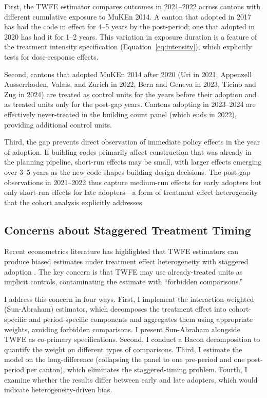 \documentclass[12pt]{article}
\begin{document}
First, the TWFE estimator compares outcomes in 2021--2022 across cantons with different cumulative exposure to MuKEn 2014. A canton that adopted in 2017 has had the code in effect for 4--5 years by the post-period; one that adopted in 2020 has had it for 1--2 years. This variation in exposure duration is a feature of the treatment intensity specification (Equation~\ref{eq:intensity}), which explicitly tests for dose-response effects.

Second, cantons that adopted MuKEn 2014 after 2020 (Uri in 2021, Appenzell Ausserrhoden, Valais, and Zurich in 2022, Bern and Geneva in 2023, Ticino and Zug in 2024) are treated as control units for the years before their adoption and as treated units only for the post-gap years. Cantons adopting in 2023--2024 are effectively never-treated in the building count panel (which ends in 2022), providing additional control units.

Third, the gap prevents direct observation of immediate policy effects in the year of adoption. If building codes primarily affect construction that was already in the planning pipeline, short-run effects may be small, with larger effects emerging over 3--5 years as the new code shapes building design decisions. The post-gap observations in 2021--2022 thus capture medium-run effects for early adopters but only short-run effects for late adopters---a form of treatment effect heterogeneity that the cohort analysis explicitly addresses.

\subsection{Concerns about Staggered Treatment Timing}

Recent econometrics literature has highlighted that TWFE estimators can produce biased estimates under treatment effect heterogeneity with staggered adoption \citep{goodman2021difference, callaway2021difference, sun2021estimating}. The key concern is that TWFE may use already-treated units as implicit controls, contaminating the estimate with ``forbidden comparisons.''

I address this concern in four ways. First, I implement the \citet{sun2021estimating} interaction-weighted (Sun-Abraham) estimator, which decomposes the treatment effect into cohort-specific and period-specific components and aggregates them using appropriate weights, avoiding forbidden comparisons. I present Sun-Abraham alongside TWFE as co-primary specifications. Second, I conduct a Bacon decomposition \citep{goodman2021difference} to quantify the weight on different types of comparisons. Third, I estimate the model on the long-difference (collapsing the panel to one pre-period and one post-period per canton), which eliminates the staggered-timing problem. Fourth, I examine whether the results differ between early and late adopters, which would indicate heterogeneity-driven bias.
\end{document}
